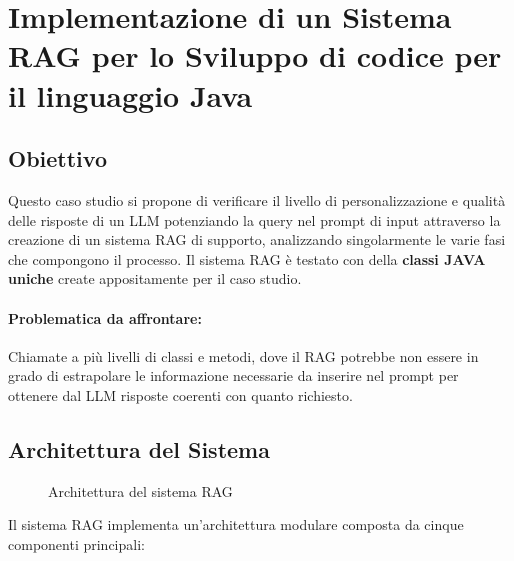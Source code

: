 \documentclass[12pt,a4paper,openright,twoside]{book}
\begin{document}
\chapter{Implementazione di un Sistema RAG per lo Sviluppo di codice per il linguaggio Java}
\section{Obiettivo}
Questo caso studio si propone di verificare il livello di personalizzazione e qualità delle risposte di un LLM potenziando la query nel prompt di input 
attraverso la creazione di un sistema RAG di supporto, analizzando singolarmente le varie fasi che compongono il processo.
Il sistema RAG è testato con della \textbf{classi JAVA uniche} create appositamente per il caso studio.
\subsubsection{Problematica da affrontare:}
Chiamate a più livelli di classi e metodi, dove il RAG potrebbe non essere in grado di estrapolare
le informazione necessarie da inserire nel prompt per ottenere dal LLM risposte coerenti con quanto richiesto.

\section{Architettura del Sistema}
\begin{figure}[h]
    \centering
    \caption{Architettura del sistema RAG}
    \label{fig:rag-architecture}
\end{figure}
Il sistema RAG implementa un'architettura modulare composta da cinque componenti principali:
\end{document}
